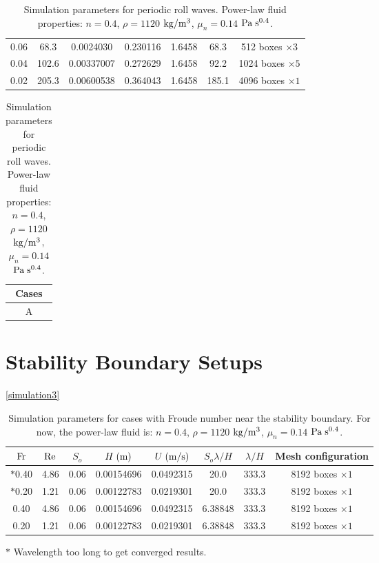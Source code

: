 \documentclass[a4paper]{article}
\newcommand{\fr}{{\rm{Fr}}}
\begin{document}
\begin{table}[htbp]
\begin{subtable}{1\textwidth}
\begin{tabular}{ccccccc}
			0.06 & 68.3 & 0.0024030 & 0.230116 & 1.6458 & 68.3 & 512 boxes $\times 3$\\
			
			0.04 & 102.6 & 0.00337007 & 0.272629 & 1.6458 & 92.2 & 1024 boxes $\times 5$\\
			
			0.02 & 205.3 & 0.00600538 & 0.364043 & 1.6458 & 185.1 & 4096 boxes $\times 1$\\
			\bottomrule 
		\end{tabular}
		\caption{Simulation parameters for $\fr=1.50$.}
		\label{params_150}
	\end{subtable}

	\vspace{0.25cm}
	
	\begin{subtable}{1\textwidth}
		\centering
		\begin{tabular}{c}
			Cases\\
			\toprule
				A \\
			\bottomrule 
		\end{tabular}
		\caption{\textcolor{red}{TODO: Simulation parameters for $\fr=1.75$.}}
		\label{params_175}
	\end{subtable}

	\caption{Simulation parameters for periodic roll waves. Power-law fluid properties: $n=0.4$, $\rho=1120$ $\rm{kg/m^3}$, $\mu_n=0.14$ $\rm Pa\;s^{0.4}$.}
	\label{simulation2}
\end{table}

\section{Stability Boundary Setups}
\autoref{simulation3}
\begin{table}[htbp]
	\centering
	\begin{tabular}{cccccccc}
		$\fr$ & $\rm Re$ & $S_o$ & $H\;{\rm (m)}$ & $U\;{\rm (m/s)}$ & $S_o\lambda/H$ & $\lambda/H$ & Mesh configuration\\
		\toprule
		$*$0.40 & 4.86 & 0.06 & 0.00154696 & 0.0492315 & 20.0 & 333.3 & 8192 boxes $\times 1$\\
		$*$0.20 & 1.21 & 0.06 & 0.00122783 & 0.0219301 & 20.0 & 333.3 & 8192 boxes $\times 1$\\
		
		0.40 & 4.86 & 0.06 & 0.00154696 & 0.0492315 & 6.38848 & 333.3 & 8192 boxes $\times 1$\\
		0.20 & 1.21 & 0.06 & 0.00122783 & 0.0219301 & 6.38848 & 333.3 & 8192 boxes $\times 1$\\
		
		\bottomrule 
	\end{tabular}
	\begin{tablenotes}
		\small
		\item $*$ Wavelength too long to get converged results.
	\end{tablenotes}
	\caption{Simulation parameters for cases with Froude number near the stability boundary. For now, the power-law fluid is: $n=0.4$, $\rho=1120$ $\rm{kg/m^3}$, $\mu_n=0.14$ $\rm Pa\;s^{0.4}$.}
	\label{simulation3}
\end{table}
\end{document}
